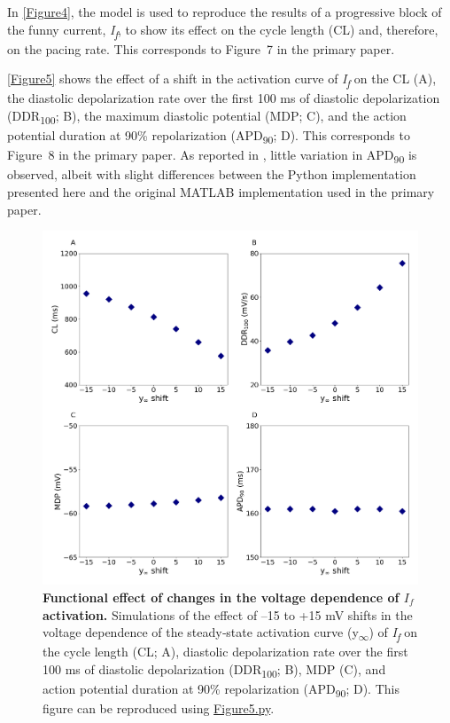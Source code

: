 \documentclass[fleqn,10pt]{physiome}
\begin{document}
In \autoref{Figure4}, the model is used to reproduce the results of a progressive block of the funny current, \textit{I\textsubscript{f}}, to show its effect on the cycle length (CL) and, therefore, on the pacing rate. This corresponds to Figure~7 in the primary paper.\newpage



\autoref{Figure5} shows the effect of a shift in the activation curve of \textit{I\textsubscript{f}} on the CL (A), the diastolic depolarization rate over the first 100 ms of diastolic depolarization (DDR\textsubscript{100}; B), the maximum diastolic potential (MDP; C), and the action potential duration at 90\% repolarization (APD\textsubscript{90}; D). This corresponds to Figure~8 in the primary paper. As reported in \citet{fabbri2017computational}, little variation in APD\textsubscript{90} is observed, albeit with slight differences between the Python implementation presented here and the original MATLAB implementation used in the primary paper.

\begin{figure}[htb]
\centering
\includegraphics[width=0.9\linewidth]{Figure5}
\caption{\textbf{Functional effect of changes in the voltage dependence of $I_{f}$ activation.}\newline
Simulations of the effect of –15 to +15 mV shifts in the voltage dependence of the steady‐state activation curve (y\textsubscript{$\infty$}) of \textit{I\textsubscript{f}} on the cycle length (CL; A), diastolic depolarization rate over the first 100 ms of diastolic depolarization (DDR\textsubscript{100}; B), MDP (C), and action potential duration at 90\% repolarization (APD\textsubscript{90}; D). This figure can be reproduced using \href{https://models.physiomeproject.org/workspace/648/rawfile/6784d6c3256c832dc98b2db42c85747ae2596518/Figure5.py}{Figure5.py}.}
\label{Figure5}
\end{figure}
\end{document}
